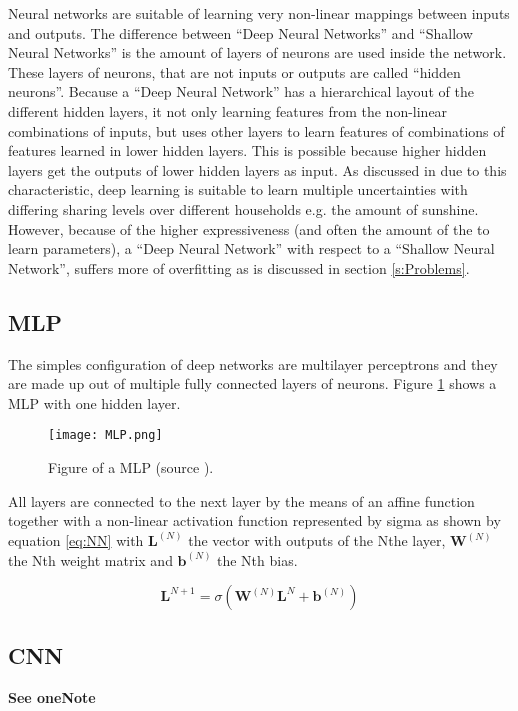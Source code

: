 Neural networks are suitable of learning very non-linear mappings between inputs and outputs. The difference between ``Deep Neural Networks'' and ``Shallow Neural Networks'' is the amount of layers of neurons are used inside the network. These layers of neurons, that are not inputs or outputs are called ``hidden neurons''. Because a ``Deep Neural Network'' has a hierarchical layout of the different hidden layers, it not only learning features from the non-linear combinations of inputs, but uses other layers to learn features of combinations of features learned in lower hidden layers. This is possible because higher hidden layers get the outputs of lower hidden layers as input. As discussed in  \cite{Shi2018} due to this characteristic, deep learning is suitable to learn multiple uncertainties with differing sharing levels over different households e.g. the amount of sunshine. However, because of the higher expressiveness (and often the amount of the to learn parameters), a ``Deep Neural Network'' with respect to a ``Shallow Neural Network'', suffers more of overfitting as is discussed in section \ref{s:Problems}.

\subsection{MLP}
The simples configuration of deep networks are multilayer perceptrons and they are made up out of multiple fully connected layers of neurons. Figure \ref{fig:MLP} shows a MLP with one hidden layer.

\begin{figure}[h!]
	\centering
	\texttt{[image: MLP.png]}
	\caption{Figure of a MLP (source \cite{Czum2020}).}
	\label{fig:MLP}
\end{figure}

All layers are connected to the next layer by the means of an affine function together with a non-linear activation function represented by sigma as shown by equation \ref{eq:NN} with $ \textbf{L}^{(N)} $ the vector with outputs of the Nthe layer, $ \textbf{W}^(N) $ the Nth weight matrix and $ \textbf{b}^{(N)} $ the Nth bias. 


\begin{equation}\label{eq:NN}
	\textbf{L}^{N+1} = \sigma(\textbf{W}^{(N)}\textbf{L}^{N}+\textbf{b}^{(N)})
\end{equation}


\subsection{CNN}
\textbf{See oneNote}

